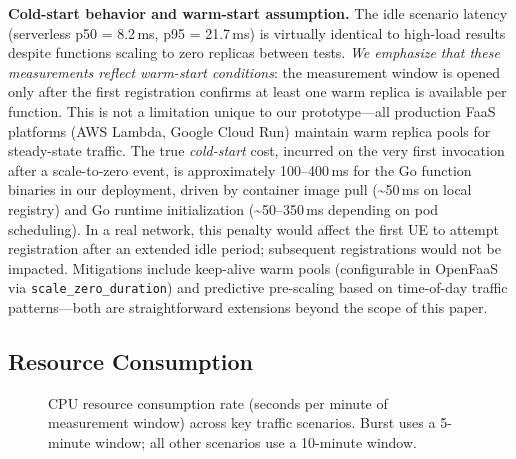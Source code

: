 \documentclass[conference]{IEEEtran}
\begin{document}
\textbf{Cold-start behavior and warm-start assumption.} The idle scenario latency (serverless p50 = 8.2\,ms, p95 = 21.7\,ms) is virtually identical to high-load results despite functions scaling to zero replicas between tests. \textit{We emphasize that these measurements reflect \emph{warm-start} conditions}: the measurement window is opened only after the first registration confirms at least one warm replica is available per function. This is not a limitation unique to our prototype---all production FaaS platforms (AWS Lambda, Google Cloud Run) maintain warm replica pools for steady-state traffic. The true \emph{cold-start} cost, incurred on the very first invocation after a scale-to-zero event, is approximately 100--400\,ms for the Go function binaries in our deployment, driven by container image pull (\textasciitilde{}50\,ms on local registry) and Go runtime initialization (\textasciitilde{}50--350\,ms depending on pod scheduling). In a real network, this penalty would affect the first UE to attempt registration after an extended idle period; subsequent registrations would not be impacted. Mitigations include keep-alive warm pools (configurable in OpenFaaS via \texttt{scale\_zero\_duration}) and predictive pre-scaling based on time-of-day traffic patterns---both are straightforward extensions beyond the scope of this paper.

\subsection{Resource Consumption}

\begin{figure}[t]
    \centering
    \caption{CPU resource consumption rate (seconds per minute of measurement window) across key traffic scenarios. Burst uses a 5-minute window; all other scenarios use a 10-minute window.}
    \label{fig:resources}
\end{figure}
\end{document}
